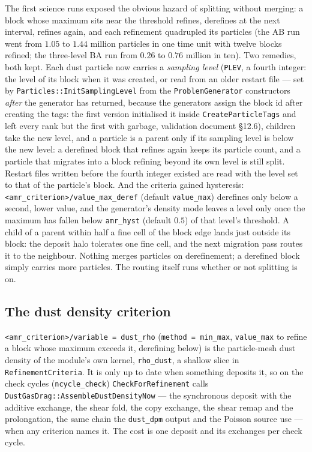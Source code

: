 \documentclass[11pt]{article}
\newcommand{\code}[1]{\texttt{#1}}
\newcommand{\fn}[1]{\texttt{\small #1}}
\begin{document}
The first science runs exposed the obvious hazard of splitting without merging: a block
whose maximum sits near the threshold refines, derefines at the next interval, refines
again, and each refinement quadrupled its particles (the AB run went from $1.05$ to
$1.44$ million particles in one time unit with twelve blocks refined; the three-level BA
run from $0.26$ to $0.76$ million in ten). Two remedies, both kept. Each dust particle
now carries a \emph{sampling level} (\code{PLEV}, a fourth integer: the level of its
block when it was created, or read from an older restart file --- set by
\fn{Particles::InitSamplingLevel} from the \code{ProblemGenerator} constructors \emph{after}
the generator has returned, because the generators assign the block id after creating
the tags: the first version initialised it inside \fn{CreateParticleTags} and left every
rank but the first with garbage, validation document \S12.6), children take the new
level, and a
particle is a parent only if its sampling level is below the new level: a derefined
block that refines again keeps its particle count, and a particle that migrates into a
block refining beyond its own level is still split. Restart files written before the
fourth integer existed are read with the level set to that of the particle's block. And the criteria gained
hysteresis: \code{<amr\_criterion>/value\_max\_deref} (default \code{value\_max})
derefines only below a second, lower value, and the generator's density mode leaves a
level only once the maximum has fallen below \code{amr\_hyst} (default $0.5$) of that
level's threshold. A child of a parent within half a fine cell of the block edge lands just
outside its block: the deposit halo tolerates one fine cell, and the next migration pass
routes it to the neighbour. Nothing merges particles on derefinement; a derefined block
simply carries more particles. The routing itself runs whether or not splitting is on.

\subsection{The dust density criterion}

\code{<amr\_criterion>/variable = dust\_rho} (\code{method = min\_max}, \code{value\_max}
to refine a block whose maximum exceeds it, derefining below) is the particle-mesh dust
density of the module's own kernel, \code{rho\_dust}, a shallow slice in
\code{RefinementCriteria}. It is only up to date when something deposits it, so on the
check cycles (\code{ncycle\_check}) \fn{CheckForRefinement} calls
\fn{DustGasDrag::AssembleDustDensityNow} --- the synchronous deposit with the additive
exchange, the shear fold, the copy exchange, the shear remap and the prolongation, the
same chain the \code{dust\_dpm} output and the Poisson source use --- when any criterion
names it. The cost is one deposit and its exchanges per check cycle.
\end{document}
